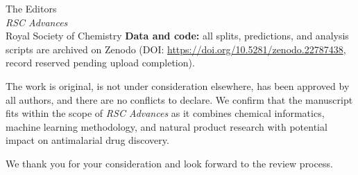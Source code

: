 \documentclass[11pt,a4paper]{letter}
\begin{document}
\begin{letter}{%
  The Editors \\
  \textit{RSC Advances} \\
  Royal Society of Chemistry
}
\textbf{Data and code:} all splits, predictions, and analysis scripts are archived on Zenodo (DOI: \url{https://doi.org/10.5281/zenodo.22787438}, record reserved pending upload completion). 

The work is original, is not under consideration elsewhere, has been approved by all authors, and there are no conflicts to declare. We confirm that the manuscript fits within the scope of \textit{RSC Advances} as it combines chemical informatics, machine learning methodology, and natural product research with potential impact on antimalarial drug discovery.


\vspace{0.3em}
\closing{We thank you for your consideration and look forward to the review process.}

\end{letter}
\end{document}
